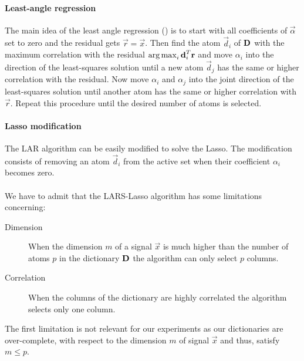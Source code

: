 \paragraph{Least-angle regression}
The main idea of the least angle regression () is
to start with all coefficients of $\vec{\alpha}$ set to zero and the residual
gets $\vec{r}=\vec{x}$. Then find the atom $\vec{d}_i$ of $\boldsymbol{\mathrm{D}}$ with the
maximum correlation with the residual $\operatorname*{arg\,max}_i\boldsymbol{\mathrm{d}}_i^T\boldsymbol{\mathrm{r}}$ and move
$\alpha_i$ into the direction of the least-squares solution until a new atom
$\vec{d}_j$ has the same or higher correlation with the residual. Now move
$\alpha_i$ and $\alpha_j$ into the joint direction of the
least-squares solution until another atom has the same or higher correlation
with $\vec{r}$. Repeat this procedure until the desired number of atoms is
selected.



\paragraph{Lasso modification}
The LAR algorithm can be easily modified to solve the Lasso. 
The modification consists of removing an atom $\vec{d}_i$ from the active set
when their coefficient $\alpha_i$ becomes zero. 

\paragraph{}
We have to admit that the LARS-Lasso algorithm has some limitations concerning:
\begin{description}
 \item[Dimension] When the dimension $m$ of a signal $\vec{x}$ is much
higher than the number of atoms $p$ in the dictionary $\boldsymbol{\mathrm{D}}$ the algorithm
can only select $p$ columns.
  \item[Correlation] When the columns of the dictionary are highly correlated
the algorithm selects only one column.
\end{description}
The first limitation is not relevant for our experiments as our dictionaries
are over-complete, with respect to the dimension $m$ of signal $\vec{x}$ and
thus, satisfy $m \leq p$. 


